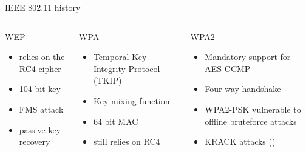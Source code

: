 \documentclass[xcolor=table]{bredelebeamer}
\begin{document}
\begin{frame}{IEEE 802.11 history}
\begin{figure}
    \label{fig:my_label}
\end{figure}    



\begin{columns}
\begin{column}{0.3\textwidth}
   \begin{block}{WEP}
   \begin{itemize}
       \item relies on the RC4 cipher
       \item 104 bit key
       \item FMS attack
       \item passive key recovery
   \end{itemize}
   \end{block}
   \vfill
\end{column}
\begin{column}{0.3\textwidth}  %
    \begin{block}{WPA}
    \begin{itemize}
        \item Temporal Key Integrity Protocol (TKIP)
        \item Key mixing function
        \item 64 bit MAC
        \item still relies on RC4
    \end{itemize}
   \end{block}
\end{column}
\begin{column}{0.3\textwidth}
    \begin{block}{WPA2}
        \begin{itemize}
   \item Mandatory support for AES-CCMP
    \item Four way handshake
   \item WPA2-PSK vulnerable to offline bruteforce attacks
   \item KRACK attacks (\cite{vanhoef-ccs2017})
   \end{itemize}
   \end{block}
\end{column}
\end{columns}
\end{frame}
\end{document}
